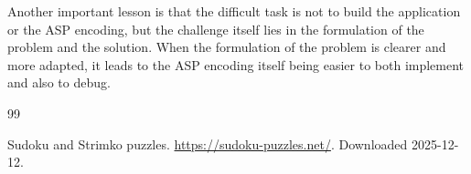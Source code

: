 \documentclass[11pt]{article}
\begin{document}
Another important lesson is that the difficult task is not to build the application or the ASP encoding, but the challenge itself lies in the formulation of the problem and the solution. When the formulation of the problem is clearer and more adapted, it leads to the ASP encoding itself being easier to both implement and also to debug.

\newpage
\begin{thebibliography}{99}

Sudoku and Strimko puzzles. \url{https://sudoku-puzzles.net/}. Downloaded 2025-12-12.


\end{thebibliography}
\end{document}
